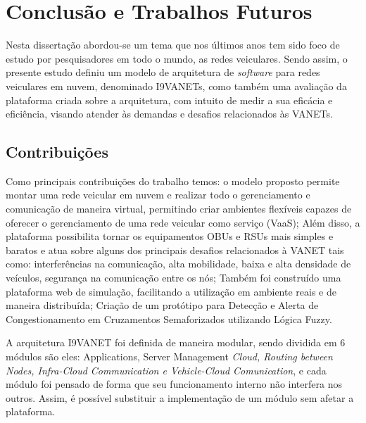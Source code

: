 \documentclass[
	12pt,				%
	oneside,			%
	a4paper,			%
	english,			%
	brazil				%
	]{abntex2ppgsi}
\begin{document}
\chapter{Conclusão e Trabalhos Futuros}\label{sec:conclusao}



Nesta dissertação abordou-se um tema que nos últimos anos tem sido foco de estudo por pesquisadores em todo o mundo, as redes veiculares. Sendo assim, o presente estudo definiu um modelo de  arquitetura de \textit{software} para redes veiculares em nuvem, denominado I9VANETs, como também uma avaliação da plataforma criada sobre a arquitetura, com intuito de medir a sua eficácia e eficiência, visando atender às demandas e desafios relacionados às VANETs. 

\section{Contribuições}

Como principais contribuições do trabalho temos: o modelo proposto permite montar uma rede veicular em nuvem e realizar todo o gerenciamento e comunicação de maneira virtual, permitindo criar ambientes flexíveis capazes de oferecer o gerenciamento de uma rede veicular como serviço (VaaS); Além disso, a plataforma possibilita tornar os equipamentos OBUs e RSUs mais simples e baratos e atua sobre alguns dos principais desafios relacionados à VANET tais como: interferências na comunicação, alta mobilidade, baixa e alta densidade de veículos, segurança na comunicação entre os nós; Também foi construído uma plataforma web de simulação, facilitando a utilização em ambiente reais e de maneira distribuída; Criação de um protótipo para Detecção e Alerta de Congestionamento em Cruzamentos Semaforizados utilizando Lógica Fuzzy.


A arquitetura I9VANET foi definida de maneira modular, sendo dividida em 6 módulos são eles: Applications, Server Management \textit{Cloud, Routing between Nodes, Infra-Cloud Communication e Vehicle-Cloud Comunication}, e cada módulo foi pensado de forma que seu funcionamento interno não interfera nos outros. Assim, é possível substituir a implementação de um módulo sem afetar a plataforma.
\end{document}

